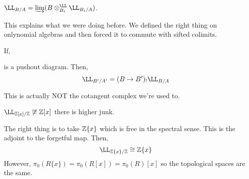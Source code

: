 \documentclass[12pt]{article}
\begin{document}
\begin{cor}
$\LL_{B/A} = \dlim (B \ot_{B_i}^{\LL} \LL_{B_i/A})$.
\end{cor}

\begin{rmk}
This explains what we were doing before. We defined the right thing on onlynomial algebras and then forced it to commute with sifted colimits.
\end{rmk}

\begin{prop}
If,
\begin{center}
\end{center}
is a pushout diagram. Then,
\[ \LL_{B'/A'} = (B \to B')_{!} \LL_{B/A} \]
\end{prop}

\begin{rmk}
This is actually NOT the cotangent complex we're used to. 
\end{rmk}

\begin{example}
$\LL_{\Z[x]/\Z} \not\cong \ZZ[x]$ there is higher junk.
\end{example}

\begin{rmk}
The right thing is to take $\mathbb{Z} \{ x \}$ which is free in the spectral sense. This is the adjoint to the forgetful map. Then,
\[ \LL_{\Z \{ x \}/\Z} \cong \ZZ \{ x \} \]
However, $\pi_0(R \{ x \}) = \pi_0(R[x]) = \pi_0(R)[x]$ so the topological spaces are the same. 
\end{rmk}
\end{document}
